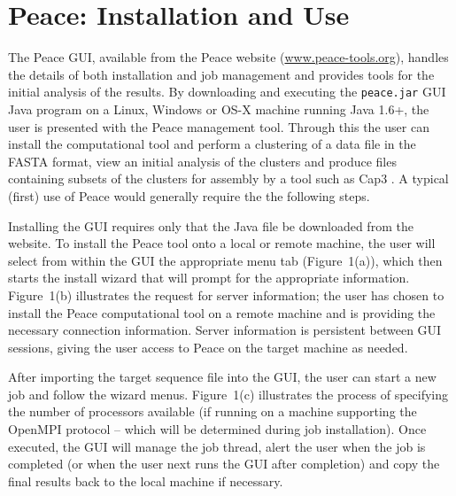 \documentclass[a4,center,fleqn]{NAR}
\begin{document}
\enlargethispage{-65.1pt}

\section{{\sc Peace}: Installation and Use}

The {\sc Peace} GUI, available from the {\sc Peace} website
(\href{http://www.peace-tools.org}{www.peace-tools.org}), handles the
details of both installation and job management and provides tools for
the initial analysis of the results.  By downloading and executing the
{\tt peace.jar} GUI Java program on a Linux, Windows or OS-X machine
running Java 1.6+, the user is presented with the {\sc Peace}
management tool.  Through this the user can install the computational
tool and perform a clustering of a data file in the FASTA format, view an initial analysis
of the clusters and produce files containing subsets of the clusters
for assembly by a tool such as {\sc Cap3} \cite{Huang99}.  A typical
(first) use of {\sc Peace} would generally require the the following
steps.

 Installing the GUI requires only
that the Java file be downloaded from the website.  To install the
{\sc Peace} tool onto a local or remote machine, the user will select
from within the GUI the appropriate menu tab (Figure~1(a)), which
then starts the install wizard that will prompt for the appropriate
information.  Figure~1(b) illustrates the request for server
information; the user has chosen to install the {\sc Peace}
computational tool on a remote machine and is providing the necessary
connection information.  Server information is persistent between GUI
sessions, giving the user access to {\sc Peace} on the target machine
as needed.

 After importing the target sequence file into
the GUI, the user can start a new job and follow the wizard menus.
Figure~1(c) illustrates the process of specifying the number of
processors available (if running on a machine supporting the OpenMPI
protocol -- which will be determined during job installation).  Once
executed, the GUI will manage the job thread, alert the user when the
job is completed (or when the user next runs the GUI after completion)
and copy the final results back to the local machine if necessary.
\end{document}
